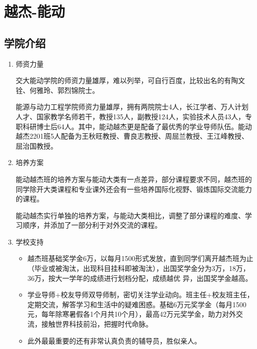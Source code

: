 \documentclass[zihao=-4,fontset=none]{Beautybook-CN}
\begin{document}
\section{越杰-能动}

\subsection{学院介绍}

\begin{enumerate}
	\item 师资力量
	      	      	          
	      交大能动学院的师资力量雄厚，难以列举，可自行百度，比较出名的有陶文铨、何雅玲、郭烈锦院士。
	      
	      能源与动力工程学院师资力量雄厚，拥有两院院士4人，长江学者、万人计划人才、国家教学名师若干，教授135人，副教授124人，实验技术人员43人，专职科研博士后64人。其中，能动越杰更是配备了最优秀的学业导师队伍。能动越杰2201班5人配备为王秋旺教授、曹良志教授、周屈兰教授、王江峰教授、屈治国教授。
	      	      	          
	\item 培养方案
	      	      	          
	      能动越杰班的培养方案与能动大类有一点差异，部分课程要求不同，越杰班的同学除开大类课程和专业课外还会有一些培养国际化视野、锻炼国际交流能力的课程。
	      
	      能动越杰实行单独的培养方案，与能动大类相比，调整了部分课程的难度、学习顺序，并添加了一部分利于对外交流的课程。
	      	      
	      	      	          
	\item 学校支持
	      	      \begin{itemize}
	      	          \item 越杰班基础奖学金6万，以每月1500形式发放，直到同学们离开越杰班为止（毕业或被淘汰，出现科目挂科即被淘汰），出国奖学金分为3万，18万，36万，按大一学年的成绩进行划档分配，成绩越优 异，出国奖学金越高。
	      
	      \item 学业导师+校友导师双导师制，密切关注学业动向。班主任+校友班主任，定期交流，解答学习和生活中的疑难困惑。基础6万元奖学金（每月1500元，每年除寒暑假各1个月共10个月），最高42万元奖学金，助力对外交流，接触世界科技前沿，把握时代命脉。
	      
	      \item 此外最最重要的还有非常认真负责的辅导员，胜似亲人。
	      	      \end{itemize}
	      
\end{enumerate}
\end{document}
